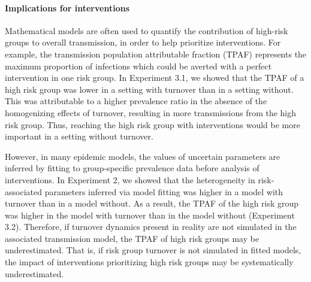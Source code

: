 \paragraph{Implications for interventions}
Mathematical models are often used to quantify
the contribution of high-risk groups to overall transmission,
in order to help prioritize interventions.
For example, the transmission population attributable fraction (TPAF)
represents the maximum proportion of infections which could be averted
with a perfect intervention in one risk group.
In Experiment 3.1, we showed that the TPAF of a high risk group
was lower in a setting with turnover than in a setting without.
This was attributable to a higher prevalence ratio
in the absence of the homogenizing effects of turnover,
resulting in more transmissions from the high risk group.
Thus, reaching the high risk group with interventions
would be more important in a setting without turnover.
\par
However, in many epidemic models,
the values of uncertain parameters are inferred
by fitting to group-specific prevalence data
before analysis of interventions.
In Experiment 2, we showed that
the heterogeneity in risk-associated parameters inferred via model fitting
was higher in a model with turnover than in a model without.
As a result, the TPAF of the high risk group
was higher in the model with turnover than in the model without (Experiment 3.2).
Therefore, if turnover dynamics present in reality
are not simulated in the associated transmission model,
the TPAF of high risk groups may be underestimated.
That is, if risk group turnover is not simulated in fitted models,
the impact of interventions prioritizing high risk groups
may be systematically underestimated.
